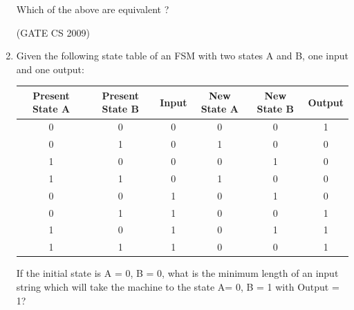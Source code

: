 \documentclass[a4paper, 11pt]{article}
\begin{document}
\begin{enumerate}
    Which of the above are equivalent ?

    \begin{enumerate}
    \end{enumerate}

    \hfill (GATE CS 2009)

    \item Given the following state table of an FSM with two states A and B, one input and one output:\\
    \begin{tabular}{|c|c|c|c|c|c|}
    \hline
        Present State A  & Present State B  & Input & New State A & New State B & Output\\
        \hline
        0  & 0  & 0 & 0 & 0 & 1\\
        \hline
        0  & 1  & 0 & 1 & 0 & 0\\
        \hline
        1  & 0  & 0 & 0 & 1 & 0\\
        \hline
        1  & 1  & 0 & 1 & 0 & 0\\
        \hline
        0  & 0  & 1 & 0 & 1 & 0\\
        \hline
        0  & 1  & 1 & 0 & 0 & 1\\
        \hline
        1  & 0  & 1 & 0 & 1 & 1\\
        \hline
        1  & 1  & 1 & 0 & 0 & 1\\
        \hline
    \end{tabular}

        If the initial state is A = 0, B = 0, what is the minimum length of an input string which will take the machine to the state A= 0, B = 1 with Output = 1?
        \begin{enumerate}
        \end{enumerate}


\end{enumerate}
\end{document}
